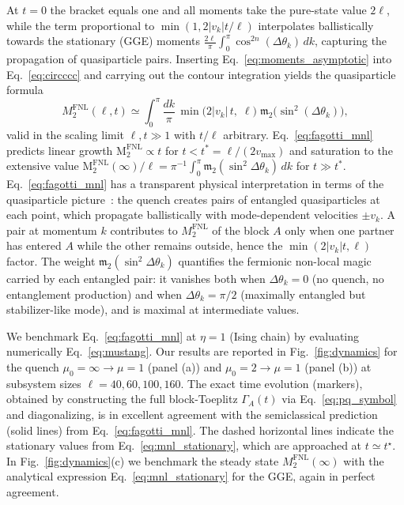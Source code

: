 \documentclass[prx,twocolumn,superscriptaddress,aps,10pt, frontmatterverbose, reprint,footinbib,longbibliography=true]{revtex4-2}
\newcommand{\NL}{\mathrm{FNL}}
\newcommand{\MNL}{\mathrm{M}_2^{\NL}}
\providecommand{\DIFaddend}{\protect\color{black}} %
\begin{document}
At $t=0$ the bracket equals one and all moments take the pure-state value $2\ell$, while the term proportional to $\min(1,2|v_k|t/\ell)$ interpolates ballistically towards  the stationary (GGE) moments $\frac{2\ell}{\pi}\int_0^\pi\cos^{2n}(\Delta\theta_k)\,dk$, capturing the propagation of quasiparticle pairs.
Inserting Eq.~\eqref{eq:moments_asymptotic} into  Eq.~\eqref{eq:circccc} and carrying out the contour integration \DIFaddend yields the quasiparticle formula
\begin{equation}
    M_2^{\mathrm{FNL}}(\ell,t) \simeq \int_0^\pi\!\frac{dk}{\pi}\,\min\!\bigl(2|v_k|\,t,\;\ell\bigr)\;\mathfrak{m}_2\!\bigl(\sin^2(\Delta\theta_k)\bigr),
    \label{eq:fagotti_mnl}
\end{equation}
valid in the scaling limit $\ell, t \gg 1$ with $t/\ell$ arbitrary.
Eq.~\eqref{eq:fagotti_mnl} predicts linear growth $\MNL \propto t$ for $t < t^* = \ell/(2v_{\max})$ and saturation to the extensive value $\MNL(\infty)/\ell = \pi^{-1}\int_0^\pi \mathfrak{m}_2(\sin^2\!\Delta\theta_k)\, dk$ for $t \gg t^*$.
Eq.~\eqref{eq:fagotti_mnl} has a transparent physical interpretation in terms of the quasiparticle picture~\cite{Calabrese2005evolution,Fagotti2008}: the quench creates pairs of entangled quasiparticles at each point, which propagate ballistically with mode-dependent velocities $\pm v_k$.
A pair at momentum $k$ contributes to $M_2^{\mathrm{FNL}}$ of the block $A$ only when one partner has entered $A$ while the other remains outside, hence the $\min(2|v_k|t,\ell)$ factor.
The weight $\mathfrak{m}_2(\sin^2\Delta\theta_k)$  quantifies the fermionic non-local magic carried by each entangled pair: it vanishes both when $\Delta\theta_k = 0$ (no quench, no entanglement production) and when $\Delta\theta_k = \pi/2$ (maximally entangled but stabilizer-like mode), and is maximal at intermediate values.

We benchmark Eq.~\eqref{eq:fagotti_mnl} at $\eta=1$ (Ising chain) by  evaluating numerically Eq.~\eqref{eq:mustang}. 
Our results are reported in Fig.~\ref{fig:dynamics} for the quench $\mu_0 = \infty \to \mu = 1$ (panel (a))  and $\mu_0 = 2 \to \mu = 1$ (panel (b)) at subsystem sizes $\ell = 40, 60, 100, 160$. 
The exact time evolution (markers), obtained by constructing the full block-Toeplitz $\Gamma_A(t)$ via Eq.~\eqref{eq:pq_symbol} and diagonalizing, is in excellent agreement with the semiclassical prediction (solid lines) from Eq.~\eqref{eq:fagotti_mnl}.
The dashed horizontal lines indicate the stationary values from Eq.~\eqref{eq:mnl_stationary}, which are approached at $t \simeq t^\star$.
In Fig.~\ref{fig:dynamics}(c) we benchmark the steady state $M_2^{\mathrm{FNL}}(\infty)$ with the analytical expression Eq.~\eqref{eq:mnl_stationary} for the GGE, again in perfect agreement. 
\end{document}
